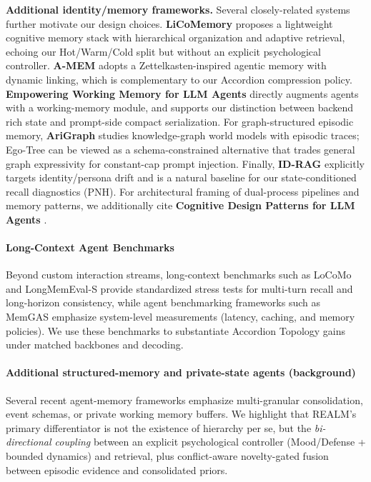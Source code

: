 \documentclass{article}
\begin{document}
\textbf{Additional identity/memory frameworks.}
Several closely-related systems further motivate our design choices. \textbf{LiCoMemory} \cite{huang2025licomemory} proposes a lightweight cognitive memory stack with hierarchical organization and adaptive retrieval, echoing our Hot/Warm/Cold split but without an explicit psychological controller. \textbf{A-MEM} \cite{xu2025amem} adopts a Zettelkasten-inspired agentic memory with dynamic linking, which is complementary to our Accordion compression policy.
\textbf{Empowering Working Memory for LLM Agents} \cite{guo2023workingmemory} directly augments agents with a working-memory module, and supports our distinction between backend rich state and prompt-side compact serialization.
For graph-structured episodic memory, \textbf{AriGraph} \cite{anokhin2025arigraph} studies knowledge-graph world models with episodic traces; Ego-Tree can be viewed as a schema-constrained alternative that trades general graph expressivity for constant-cap prompt injection.
Finally, \textbf{ID-RAG} \cite{platnick2025idrag} explicitly targets identity/persona drift and is a natural baseline for our state-conditioned recall diagnostics (PNH).
For architectural framing of dual-process pipelines and memory patterns, we additionally cite \textbf{Cognitive Design Patterns for LLM Agents} \cite{wray2025cognitivedesignpatterns}.

\paragraph{Long-Context Agent Benchmarks}
Beyond custom interaction streams, long-context benchmarks such as LoCoMo and LongMemEval-S provide standardized stress tests for multi-turn recall and long-horizon consistency, while agent benchmarking frameworks such as MemGAS emphasize system-level measurements (latency, caching, and memory policies). We use these benchmarks to substantiate Accordion Topology gains under matched backbones and decoding.

\paragraph{Additional structured-memory and private-state agents (background)}
Several recent agent-memory frameworks emphasize multi-granular consolidation, event schemas, or private working memory buffers. We highlight that REALM's primary differentiator is not the existence of hierarchy per se, but the \emph{bi-directional coupling} between an explicit psychological controller (Mood/Defense + bounded dynamics) and retrieval, plus conflict-aware novelty-gated fusion between episodic evidence and consolidated priors.
\end{document}
